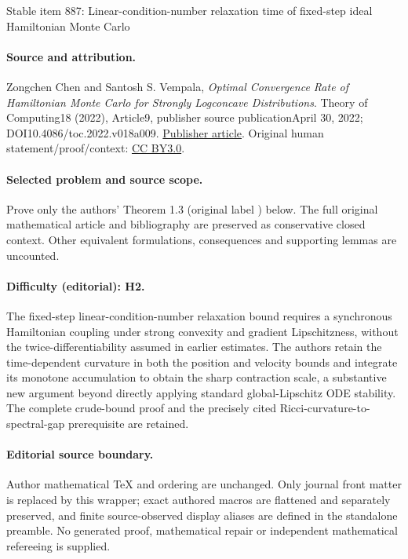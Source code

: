 \documentclass[11pt]{article}
\numberwithin{equation}{section}
\theoremstyle{definition}
\theoremstyle{plain}
\begin{document}
\begin{center}{\Large Stable item 887: Linear-condition-number relaxation time of fixed-step ideal Hamiltonian Monte Carlo}\end{center}
\paragraph{Source and attribution.}
Zongchen Chen and Santosh S. Vempala, \emph{Optimal Convergence Rate of Hamiltonian Monte Carlo for Strongly Logconcave Distributions}. Theory of Computing18 (2022), Article9, publisher source publicationApril 30, 2022; DOI10.4086/toc.2022.v018a009. \href{https://theoryofcomputing.org/articles/v018a009/}{Publisher article}. Original human statement/proof/context: \href{https://creativecommons.org/licenses/by/3.0/}{CC BY3.0}.
\paragraph{Selected problem and source scope.}
Prove only the authors' Theorem 1.3 (original label ) below. The full original mathematical article and bibliography are preserved as conservative closed context. Other equivalent formulations, consequences and supporting lemmas are uncounted.
\paragraph{Difficulty (editorial): H2.}
The fixed-step linear-condition-number relaxation bound requires a synchronous Hamiltonian coupling under strong convexity and gradient Lipschitzness, without the twice-differentiability assumed in earlier estimates. The authors retain the time-dependent curvature in both the position and velocity bounds and integrate its monotone accumulation to obtain the sharp contraction scale, a substantive new argument beyond directly applying standard global-Lipschitz ODE stability. The complete crude-bound proof and the precisely cited Ricci-curvature-to-spectral-gap prerequisite are retained.
\paragraph{Editorial source boundary.}
Author mathematical TeX and ordering are unchanged. Only journal front matter is replaced by this wrapper; exact authored macros are flattened and separately preserved, and finite source-observed display aliases are defined in the standalone preamble. No generated proof, mathematical repair or independent mathematical refereeing is supplied. 
\clearpage
\end{document}

